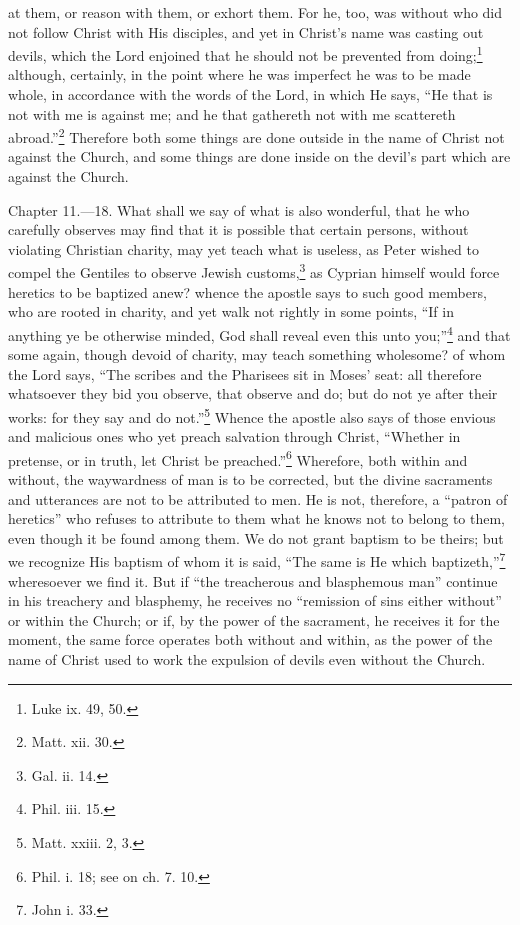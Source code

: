 at them, or reason with them, or exhort them. For he, too, was without who did not follow Christ with His disciples, and yet in Christ’s name was casting out devils, which the Lord enjoined that he should not be prevented from doing;\footnote{\par  Luke ix. 49, 50.} although, certainly, in the point where he was imperfect he was to be made whole, in accordance with the words of the Lord, in which He says, ``He that is not with me is against me; and he that gathereth not with me scattereth abroad.''\footnote{\par  Matt. xii. 30.} Therefore both some things are done outside in the name of Christ not against the Church, and some things are done inside on the devil’s part which are against the Church.


Chapter 11.—18. What shall we say of what is also wonderful, that he who carefully observes may find that it is possible that certain persons, without violating Christian charity, may yet teach what is useless, as Peter wished to compel the Gentiles to observe Jewish customs,\footnote{\par  Gal. ii. 14.} as Cyprian himself would force heretics to be baptized anew? whence the apostle says to such good members, who are rooted in charity, and yet walk not rightly in some points, ``If in anything ye be otherwise minded, God shall reveal even this unto you;''\footnote{\par  Phil. iii. 15.} and that some again, though devoid of charity, may teach something wholesome? of whom the Lord says, ``The scribes and the Pharisees sit in Moses’ seat: all therefore whatsoever they bid you observe, that observe and do; but do not ye after their works: for they say and do not.''\footnote{\par  Matt. xxiii. 2, 3.} Whence the apostle also says of those envious and malicious ones who yet preach salvation through Christ, ``Whether in pretense, or in truth, let Christ be preached.''\footnote{\par  Phil. i. 18; see on ch. 7. 10.} Wherefore, both within and without, the waywardness of man is to be corrected, but the divine sacraments and utterances are not to be attributed to men. He is not, therefore, a ``patron of heretics'' who refuses to attribute to them what he knows not to belong to them, even though it be found among them. We do not grant baptism to be theirs; but we recognize His baptism of whom it is said, ``The same is He which baptizeth,''\footnote{\par  John i. 33.} wheresoever we find it. But if ``the treacherous and blasphemous man'' continue in his treachery and blasphemy, he receives no ``remission of sins either without'' or within the Church; or if, by the power of the sacrament, he receives it for the moment, the same force operates both without and within, as the power of the name of Christ used to work the expulsion of devils even without the Church.

